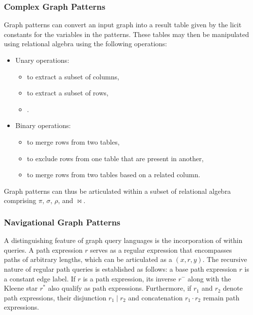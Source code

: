 \subsubsection{Complex Graph Patterns}
Graph patterns can convert an input graph into a result table given by the licit constants for the variables in the patterns. These tables may then be manipulated using relational algebra using the following operations:
\begin{itemize}
    \item Unary operations:
    \begin{itemize}
        \item {} to extract a subset of columns,
        \item {} to extract a subset of rows,
        \item {}.
    \end{itemize}
    \item Binary operations:
    \begin{itemize}
        \item {} to merge rows from two tables,
        \item {} to exclude rows from one table that are present in another,
        \item {} to merge rows from two tables based on a related column.
    \end{itemize}
\end{itemize}
Graph patterns can thus be articulated within a subset of relational algebra comprising $\pi$, $\sigma$, $\rho$, and $\bowtie$.

\subsubsection{Navigational Graph Patterns}
A distinguishing feature of graph query languages is the incorporation of  within queries. A path expression $r$ serves as a regular expression that encompasses paths of arbitrary lengths, which can be articulated as a  $(x,r,y)$. The recursive nature of regular path queries is established as follows: a base path expression $r$ is a constant edge label. If $r$ is a path expression, its inverse $r^-$ along with the Kleene star $r^*$ also qualify as path expressions. Furthermore, if $r_1$ and $r_2$ denote path expressions, their disjunction $r_1 \mid r_2$ and concatenation $r_1 \cdot r_2$ remain path expressions.

